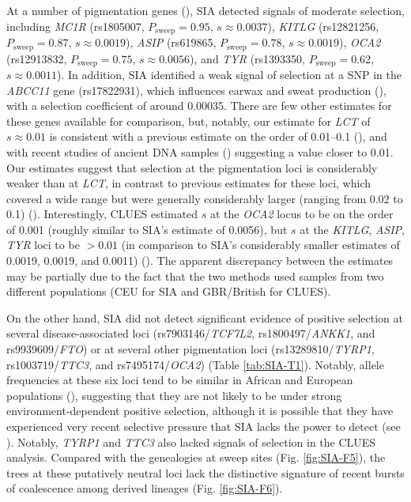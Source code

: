 At a number of pigmentation genes (\cite{sulem_genetic_2007,han_genome-wide_2008,sturm_single_2008,liu_digital_2010,kenny_melanesian_2012}), \ac{SIA} detected signals of moderate selection, including \textit{MC1R} (rs1805007, $P_{\mathrm{sweep}} = 0.95$, $s \approx 0.0037$), \textit{KITLG} (rs12821256, $P_{\mathrm{sweep}} = 0.87$, $s \approx 0.0019$), \textit{ASIP} (rs619865, $P_{\mathrm{sweep}} = 0.78$, $s \approx 0.0019$), \textit{OCA2} (rs12913832, $P_{\mathrm{sweep}} = 0.75$, $s \approx 0.0056$), and \textit{TYR} (rs1393350, $P_{\mathrm{sweep}} = 0.62$, $s \approx 0.0011$). In addition, \ac{SIA} identified a weak signal of selection at a \acs{SNP} in the \textit{ABCC11} gene (rs17822931), which influences earwax and sweat production (\cite{yoshiura_snp_2006}), with a selection coefficient of around 0.00035. There are few other estimates for these genes available for comparison, but, notably, our estimate for \textit{LCT} of $s \approx 0.01$ is consistent with a previous estimate on the order of 0.01–0.1 (\cite{bersaglieri_genetic_2004}), and with recent studies of ancient DNA samples (\cite{mathieson_fads1_2018,mathieson_estimating_2020}) suggesting a value closer to 0.01. Our estimates suggest that selection at the pigmentation loci is considerably weaker than at \textit{LCT}, in contrast to previous estimates for these loci, which covered a wide range but were generally considerably larger (ranging from 0.02 to 0.1) (\cite{wilde_direct_2014}). Interestingly, CLUES estimated $s$ at the \textit{OCA2} locus to be on the order of 0.001 (roughly similar to \ac{SIA}’s estimate of 0.0056), but $s$ at the \textit{KITLG}, \textit{ASIP}, \textit{TYR} loci to be $>0.01$ (in comparison to \ac{SIA}’s considerably smaller estimates of 0.0019, 0.0019, and 0.0011) (\cite{stern_approximate_2019}). The apparent discrepancy between the estimates may be partially due to the fact that the two methods used samples from two different populations (CEU for SIA and GBR/British for CLUES).

On the other hand, SIA did not detect significant evidence of positive selection at several disease-associated loci (rs7903146/\textit{TCF7L2}, rs1800497/\textit{ANKK1}, and rs9939609/\textit{FTO}) or at several other pigmentation loci (rs13289810/\textit{TYRP1}, rs1003719/\textit{TTC3}, and rs7495174/\textit{OCA2}) (Table \ref{tab:SIA-T1}). Notably, allele frequencies at these six loci tend to be similar in African and European populations (\cite{marcus_visualizing_2017}), suggesting that they are not likely to be under strong environment-dependent positive selection, although it is possible that they have experienced very recent selective pressure that \ac{SIA} lacks the power to detect (see ). Notably, \textit{TYRP1} and \textit{TTC3} also lacked signals of selection in the CLUES analysis. Compared with the genealogies at sweep sites (Fig. \ref{fig:SIA-F5}), the trees at these putatively neutral loci lack the distinctive signature of recent bursts of coalescence among derived lineages (Fig. \ref{fig:SIA-F6}).

